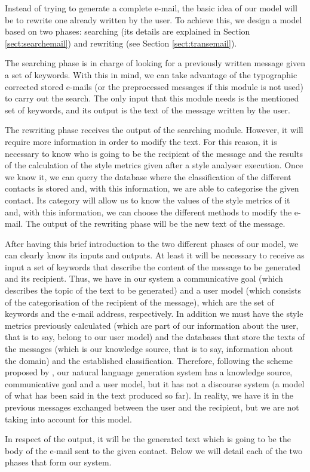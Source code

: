 Instead of trying to generate a complete e-mail, the basic idea of our model will be to rewrite one already written by the user. To achieve this, we design a model based on two phases: searching (its details are explained in Section \ref{sect:searchemail}) and rewriting (see Section \ref{sect:transemail}).

The searching phase is in charge of looking for a previously written message given a set of keywords. With this in mind, we can take advantage of the typographic corrected stored e-mails (or the preprocessed messages if this module is not used) to carry out the search. The only input that this module needs is the mentioned set of keywords, and its output is the text of the message written by the user.

The rewriting phase receives the output of the searching module. However, it will require more information in order to modify the text. For this reason, it is necessary to know who is going to be the recipient of the message and the results of the calculation of the style metrics given after a style analyser execution. Once we know it, we can query the database where the classification of the different contacts is stored and, with this information, we are able to categorise the given contact. Its category will allow us to know the values of the style metrics of it and, with this information, we can choose the different methods to modify the e-mail. The output of the rewriting phase will be the new text of the message.

After having this brief introduction to the two different phases of our model, we can clearly know its inputs and outputs. At least it will be necessary to receive as input a set of keywords that describe the content of the message to be generated and its recipient. Thus, we have in our system a communicative goal (which describes the topic of the text to be generated) and a user model (which consists of the categorisation of the recipient of the message), which are the set of keywords and the e-mail address, respectively. In addition we must have the style metrics previously calculated (which are part of our information about the user, that is to say, belong to our user model) and the databases that store the texts of the messages (which is our knowledge source, that is to say, information about the domain) and the established classification. Therefore, following the scheme proposed by \cite{reiter2000building}, our natural language generation system has a knowledge source, communicative goal and a user model, but it has not a discourse system (a model of what has been said in the text produced so far). In reality, we have it in the previous messages exchanged between the user and the recipient, but we are not taking into account for this model.

In respect of the output, it will be the generated text which is going to be the body of the e-mail sent to the given contact. Below we will detail each of the two phases that form our system.